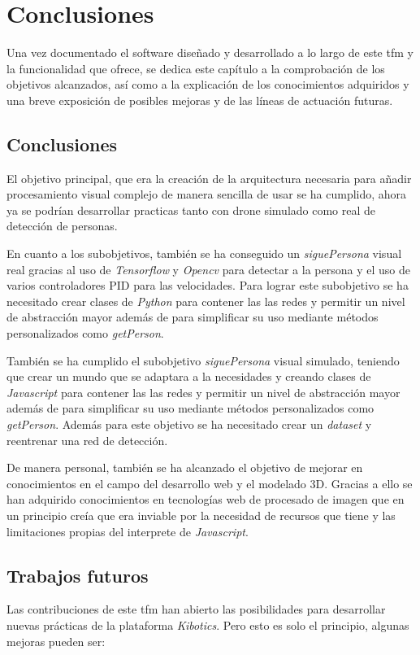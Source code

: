 \chapter{Conclusiones}\label{cap.conclusiones}
Una vez documentado el software diseñado y desarrollado a lo largo de este \acrshort{tfm} y la funcionalidad que ofrece, se dedica este capítulo a la comprobación de los objetivos alcanzados, así como a la explicación de los conocimientos adquiridos y una breve exposición de posibles mejoras y de las líneas de actuación futuras.
\section{Conclusiones}
El objetivo principal, que era la creación de la arquitectura necesaria para añadir procesamiento visual complejo de manera sencilla de usar se ha cumplido, ahora ya se podrían desarrollar practicas tanto con drone simulado como real de detección de personas.
\newline

En cuanto a los subobjetivos, también se ha conseguido un \textit{siguePersona} visual real gracias al uso de \textit{Tensorflow} y \textit{Opencv} para detectar a la persona y el uso de varios controladores PID para las velocidades. Para lograr este subobjetivo se ha necesitado crear clases de \textit{Python} para contener las las redes y permitir un nivel de abstracción mayor además de para simplificar su uso mediante métodos personalizados como \textit{getPerson}.
\newline

También se ha cumplido el subobjetivo \textit{siguePersona} visual simulado, teniendo que crear un mundo que se adaptara a la necesidades y creando clases de \textit{Javascript} para contener las las redes y permitir un nivel de abstracción mayor además de para simplificar su uso mediante métodos personalizados como \textit{getPerson}. Además para este objetivo se ha necesitado crear un \textit{dataset} y reentrenar una red de detección.
\newline

De manera personal, también se ha alcanzado el objetivo de mejorar en conocimientos en el campo del desarrollo web y el modelado 3D. Gracias a ello se han adquirido conocimientos en tecnologías web de procesado de imagen que en un principio creía que era inviable por la necesidad de recursos que tiene y las limitaciones propias del interprete de \textit{Javascript}.
\section{Trabajos futuros}
Las contribuciones de este \acrshort{tfm} han abierto las posibilidades para desarrollar nuevas prácticas de la plataforma \textit{Kibotics}. Pero esto es solo el principio, algunas mejoras pueden ser:

